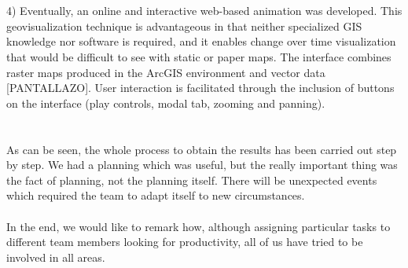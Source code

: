 \\
\\
4) Eventually, an online and interactive web-based animation was developed. This geovisualization technique is advantageous in that neither specialized GIS knowledge nor software is required, and it enables change over time visualization that would be difficult to see with static or paper maps. The interface combines raster maps produced in the ArcGIS environment and vector data [PANTALLAZO]. User interaction is facilitated through the inclusion of buttons on the interface (play controls, modal tab, zooming and panning).
\\
\\
\\
As can be seen, the whole process to obtain the results has been carried out step by step. We had a planning which was useful, but the really important thing was the fact of planning, not the planning itself. There will be unexpected events which required the team to adapt itself to new circumstances.
\\
\\
In the end, we would like to remark how, although assigning particular tasks to different team members looking for productivity, all of us have tried to be involved in all areas.
\\
\\